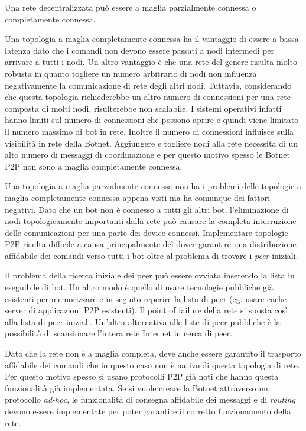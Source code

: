 Una rete decentralizzata può essere a maglia parzialmente connessa o completamente connessa.

Una topologia a maglia completamente connessa ha il vantaggio di essere a bassa latenza dato che i comandi non devono essere passati a nodi intermedi per arrivare a tutti i nodi. Un altro vantaggio è che una rete del genere risulta molto robusta in quanto togliere un numero arbitrario di nodi non influenza negativamente la comunicazione di rete degli altri nodi. Tuttavia, considerando che questa topologia richiederebbe un altro numero di connessioni per una rete composta di molti nodi, risulterebbe non scalabile. I sistemi operativi infatti hanno limiti sul numero di connessioni che possono aprire e quindi viene limitato il numero massimo di bot in rete. Inoltre il numero di connessioni influisce sulla visibilità in rete della Botnet. Aggiungere e togliere nodi alla rete necessita di un alto numero di messaggi di coordinazione e per questo motivo spesso le Botnet P2P non sono a maglia completamente connessa.

Una topologia a maglia parzialmente connessa non ha i problemi delle topologie a maglia completamente connessa appena visti ma ha comunque dei fattori negativi. 
Dato che un bot non è connesso a tutti gli altri bot, l'eliminazione di nodi topologicamente importanti dalla rete può causare la completa interruzione delle comunicazioni per una parte dei device connessi.
Implementare topologie P2P risulta difficile a causa principalmente del dover garantire una distribuzione affidabile dei comandi verso tutti i bot oltre al problema di trovare i \textit{peer} iniziali.

Il problema della ricerca iniziale dei peer può essere ovviata inserendo la lista in eseguibile di bot. Un altro modo è quello di usare tecnologie pubbliche già esistenti per memorizzare e in seguito reperire la lista di peer (eg. usare cache server di applicazioni P2P esistenti). Il point of failure della rete si sposta così alla lista di peer iniziali. Un'altra alternativa alle liste di peer pubbliche è la possibilità di scansionare l'intera rete Internet in cerca di peer.

Dato che la rete non è a maglia completa, deve anche essere garantito il trasporto affidabile dei comandi che in questo caso non è nativo di questa topologia di rete. Per questo motivo spesso si usano protocolli P2P già noti che hanno questa funzionalità già implementata. Se si vuole creare la Botnet attraverso un protocollo \textit{ad-hoc}, le funzionalità di consegna affidabile dei messaggi e di \textit{routing} devono essere implementate per poter garantire il corretto funzionamento della rete.

